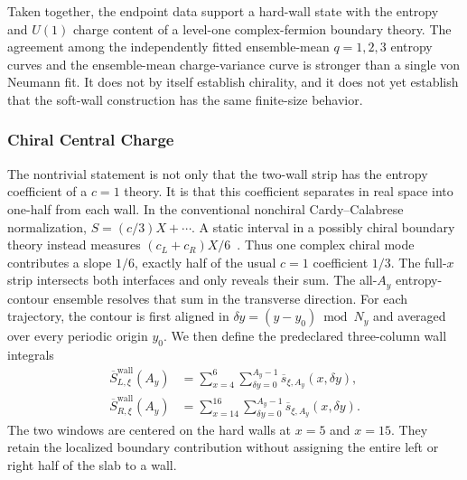 \documentclass[aps,prb,twocolumn,superscriptaddress,longbibliography,floatfix]{revtex4-2}
\theoremstyle{plain}
\theoremstyle{definition}
\theoremstyle{remark}
\begin{document}
Taken together, the endpoint data support a hard-wall state with the entropy
and $U(1)$ charge content of a level-one complex-fermion boundary theory.  The
agreement among the independently fitted ensemble-mean $q=1,2,3$ entropy
curves and the ensemble-mean charge-variance curve is stronger than a single
von Neumann fit.  It does not by itself establish chirality, and it does not
yet establish that the soft-wall construction has the same finite-size
behavior.

\subsubsection{Chiral Central Charge}
The nontrivial statement is not only that the two-wall strip has the entropy
coefficient of a $c=1$ theory.  It is that this coefficient separates in real
space into one-half from each wall.  In the conventional nonchiral
Cardy--Calabrese normalization, $S=(c/3)X+\cdots$.  A static interval in a
possibly chiral boundary theory instead measures
$(c_L+c_R)X/6$~\cite{CalabreseCardy2004,CastroDetournayIqbalPerlmutter2014}.
Thus one complex chiral mode contributes a slope $1/6$, exactly half of the
usual $c=1$ coefficient $1/3$.  The full-$x$ strip intersects both interfaces
and only reveals their sum.  The all-$A_y$ entropy-contour ensemble resolves
that sum in the transverse direction.  For each trajectory, the contour is
first aligned in $\delta y=(y-y_0)\bmod N_y$ and averaged over every periodic
origin $y_0$.  We then define the predeclared three-column wall integrals
\begin{align}
 \overline S^{\mathrm{wall}}_{L,\xi}(A_y)
 &=\sum_{x=4}^{6}\sum_{\delta y=0}^{A_y-1}
   \overline s_{\xi,A_y}(x,\delta y),
 \nonumber\\
 \overline S^{\mathrm{wall}}_{R,\xi}(A_y)
 &=\sum_{x=14}^{16}\sum_{\delta y=0}^{A_y-1}
   \overline s_{\xi,A_y}(x,\delta y).
 \label{eq:WallResolvedContourEntropy}
\end{align}
The two windows are centered on the hard walls at $x=5$ and $x=15$.
They retain the localized boundary contribution without assigning the entire
left or right half of the slab to a wall.
\end{document}
